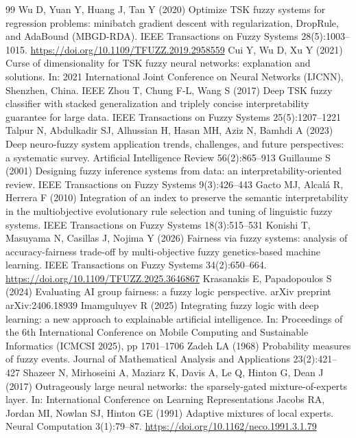 \documentclass[pdflatex,sn-basic,Numbered,lineno]{sn-jnl}
\begin{document}
\begin{thebibliography}{99}
 Wu D, Yuan Y, Huang J, Tan Y (2020) Optimize TSK fuzzy systems for regression problems: minibatch gradient descent with regularization, DropRule, and AdaBound (MBGD-RDA). IEEE Transactions on Fuzzy Systems 28(5):1003–1015. \url{https://doi.org/10.1109/TFUZZ.2019.2958559}
 Cui Y, Wu D, Xu Y (2021) Curse of dimensionality for TSK fuzzy neural networks: explanation and solutions. In: 2021 International Joint Conference on Neural Networks (IJCNN), Shenzhen, China. IEEE
 Zhou T, Chung F-L, Wang S (2017) Deep TSK fuzzy classifier with stacked generalization and triplely concise interpretability guarantee for large data. IEEE Transactions on Fuzzy Systems 25(5):1207–1221
 Talpur N, Abdulkadir SJ, Alhussian H, Hasan MH, Aziz N, Bamhdi A (2023) Deep neuro-fuzzy system application trends, challenges, and future perspectives: a systematic survey. Artificial Intelligence Review 56(2):865–913
 Guillaume S (2001) Designing fuzzy inference systems from data: an interpretability-oriented review. IEEE Transactions on Fuzzy Systems 9(3):426–443
 Gacto MJ, Alcalá R, Herrera F (2010) Integration of an index to preserve the semantic interpretability in the multiobjective evolutionary rule selection and tuning of linguistic fuzzy systems. IEEE Transactions on Fuzzy Systems 18(3):515–531
 Konishi T, Masuyama N, Casillas J, Nojima Y (2026) Fairness via fuzzy systems: analysis of accuracy-fairness trade-off by multi-objective fuzzy genetics-based machine learning. IEEE Transactions on Fuzzy Systems 34(2):650–664. \url{https://doi.org/10.1109/TFUZZ.2025.3646867}
 Krasanakis E, Papadopoulos S (2024) Evaluating AI group fairness: a fuzzy logic perspective. arXiv preprint arXiv:2406.18939
 Imamguluyev R (2025) Integrating fuzzy logic with deep learning: a new approach to explainable artificial intelligence. In: Proceedings of the 6th International Conference on Mobile Computing and Sustainable Informatics (ICMCSI 2025), pp 1701–1706
 Zadeh LA (1968) Probability measures of fuzzy events. Journal of Mathematical Analysis and Applications 23(2):421–427
 Shazeer N, Mirhoseini A, Maziarz K, Davis A, Le Q, Hinton G, Dean J (2017) Outrageously large neural networks: the sparsely-gated mixture-of-experts layer. In: International Conference on Learning Representations
 Jacobs RA, Jordan MI, Nowlan SJ, Hinton GE (1991) Adaptive mixtures of local experts. Neural Computation 3(1):79–87. \url{https://doi.org/10.1162/neco.1991.3.1.79}

\end{thebibliography}
\end{document}
